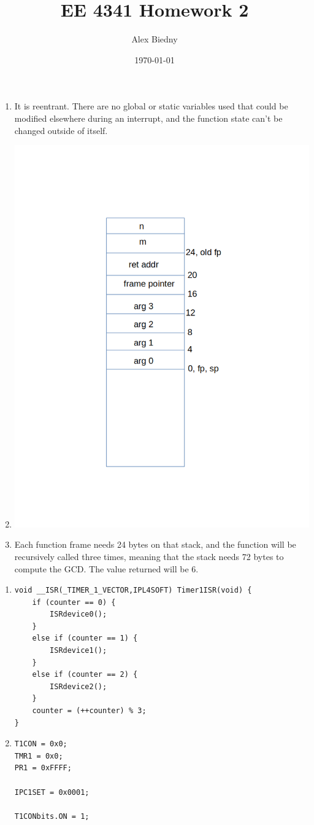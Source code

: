 \documentclass{jhwhw}
\title{EE 4341 Homework 2}
\author{Alex Biedny}
\date{\today}
\begin{document}
\maketitle

\problem{}
\begin{enumerate}
\item It is reentrant. There are no global or static variables used that could be modified elsewhere during an interrupt, and the function state can't be changed outside of itself.
\item
\includegraphics[scale=0.50]{HW2-1.png}
\item Each function frame needs 24 bytes on that stack, and the function will be recursively called three times, meaning that the stack needs 72 bytes to compute the GCD. The value returned will be 6.
\end{enumerate}

\problem{}
\begin{enumerate}
\item \begin{verbatim}
void __ISR(_TIMER_1_VECTOR,IPL4SOFT) Timer1ISR(void) {
    if (counter == 0) {
        ISRdevice0();
    }
    else if (counter == 1) {
        ISRdevice1();
    }
    else if (counter == 2) {
        ISRdevice2();
    }
    counter = (++counter) % 3;
}
\end{verbatim}
\item \begin{verbatim}
T1CON = 0x0;
TMR1 = 0x0;
PR1 = 0xFFFF;
    
IPC1SET = 0x0001;
    
T1CONbits.ON = 1;
\end{verbatim}
\end{enumerate}
\end{document}

